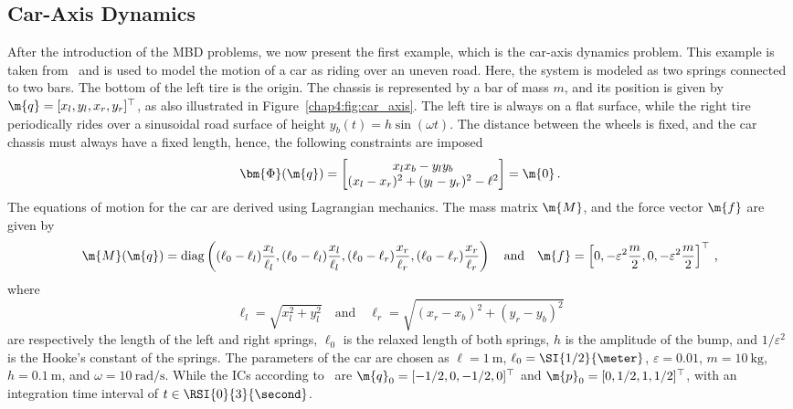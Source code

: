 \subsection{Car-Axis Dynamics}

After the introduction of the \ac{MBD} problems, we now present the first example, which is the car-axis dynamics problem. This example is taken from~\cite{lioen1998test, mazzia2008test} and is used to model the motion of a car as riding over an uneven road. Here, the system is modeled as two springs connected to two bars. The bottom of the left tire is the origin. The chassis is represented by a bar of mass $m$, and its position is given by $\m{q} = [x_l, y_l, x_r, y_r]^\top$, as also illustrated in Figure~\ref{chap4:fig:car_axis}. The left tire is always on a flat surface, while the right tire periodically rides over a sinusoidal road surface of height $y_b(t) = h\sin(\omega t)$. The distance between the wheels is fixed, and the car chassis must always have a fixed length, hence, the following constraints are imposed
%
\begin{equation*}
  \bm{\Phi}(\m{q}) = \begin{bmatrix}
    x_l x_b - y_l y_b \\
    (x_l - x_r)^2 + (y_l - y_r)^2 - \ell^2
  \end{bmatrix} = \m{0} \, \text{.}
\end{equation*}
%
The equations of motion for the car are derived using Lagrangian mechanics. The mass matrix $\m{M}$, and the force vector $\m{f}$ are given by
%
\begin{equation*}
  \m{M}(\m{q}) = \mathrm{diag}\left(
    (\ell_0-\ell_l)\dfrac{x_l}{\ell_l},
    (\ell_0-\ell_l)\dfrac{x_l}{\ell_l},
    (\ell_0-\ell_r)\dfrac{x_r}{\ell_r},
    (\ell_0-\ell_r)\dfrac{x_r}{\ell_r}
  \right)
  \quad \text{and} \quad
  \m{f} = \left[
    0, -\varepsilon^2\dfrac{m}{2},
    0, -\varepsilon^2\dfrac{m}{2}
  \right]^{\top}
  \, \text{,}
\end{equation*}
%
where
%
\begin{equation*}
  \ell_l = \sqrt{x_l^2 + y_l^2}
  \quad \text{and} \quad
  \ell_r = \sqrt{(x_r - x_b)^2 + (y_r - y_b)^2}
\end{equation*}
%
are respectively the length of the left and right springs, $\ell_0$ is the relaxed length of both springs, $h$ is the amplitude of the bump, and $1/\varepsilon^2$ is the Hooke's constant of the springs. The parameters of the car are chosen as $\ell = \SI{1}{\meter}$, $\ell_0 = \SI{1/2}{\meter}$, $\varepsilon = 0.01$, $m = \SI{10}{\kilo\gram}$, $h = \SI{0.1}{\meter}$, and $\omega = \SI{10}{\radian\per\second}$. While the \acp{IC} according to~\cite{lioen1998test, mazzia2008test} are $\m{q}_0 = [-1/2, 0, -1/2, 0]^\top$ and $\m{p}_0 = [0, 1/2, 1, 1/2]^\top$, with an integration time interval of $t \in \RSI{0}{3}{\second}$.

